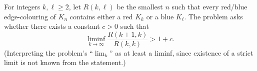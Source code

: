 For integers $k,\ell\ge 2$, let $R(k,\ell)$ be the smallest $n$ such that every red/blue edge-colouring of $K_n$ contains either a red $K_k$ or a blue $K_\ell$.
The problem asks whether there exists a constant $c>0$ such that
\[
\liminf_{k\to\infty}\frac{R(k+1,k)}{R(k,k)} > 1+c.
\]
(Interpreting the problem's ``$\lim_k$'' as at least a liminf, since existence of a strict limit is not known from the statement.)
